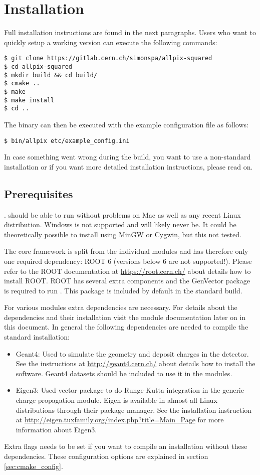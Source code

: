 \section{Installation}
Full installation instructions are found in the next paragraphs. Users who want to quickly setup a working version can execute the following commands:
\begin{verbatim}
$ git clone https://gitlab.cern.ch/simonspa/allpix-squared
$ cd allpix-squared
$ mkdir build && cd build/
$ cmake ..
$ make
$ make install
$ cd ..
\end{verbatim}
The binary can then be executed with the example configuration file as follows:
\begin{verbatim}
$ bin/allpix etc/example_config.ini
\end{verbatim}

In case something went wrong during the build, you want to use a non-standard installation or if you want more detailed installation instructions, please read on.
\subsection{Prerequisites}
\label{sec:prerequisites}.
\apsq should be able to run without problems on Mac as well as any recent Linux distribution. Windows is not supported and will likely never be. It could be theoretically possible to install \apsq using MinGW or Cygwin, but this not tested.

The core framework is split from the individual modules and \apsq has therefore only one required dependency: ROOT 6 (versions below 6 are not supported!). Please refer to the ROOT documentation at \url{https://root.cern.ch/} about details how to install ROOT. ROOT has several extra components and the GenVector package is required to run \apsq. This package is included by default in the standard build.

For various modules extra dependencies are necessary. For details about the dependencies and their installation visit the module documentation later on in this document. In general the following dependencies are needed to compile the standard installation:
\begin{itemize}
\item Geant4: Used to simulate the geometry and deposit charges in the detector. See the instructions at \url{http://geant4.cern.ch/} about details how to install the software. Geant4 datasets should be included to use it in the modules.
\item Eigen3: Used vector package to do Runge-Kutta integration in the generic charge propagation module. Eigen is available in almost all Linux distributions through their package manager. See the installation instruction at \url{http://eigen.tuxfamily.org/index.php?title=Main_Page} for more information about Eigen3.
\end{itemize}
Extra flags needs to be set if you want to compile an \apsq installation without these dependencies. These configuration options are explained in section \ref{sec:cmake_config}.

